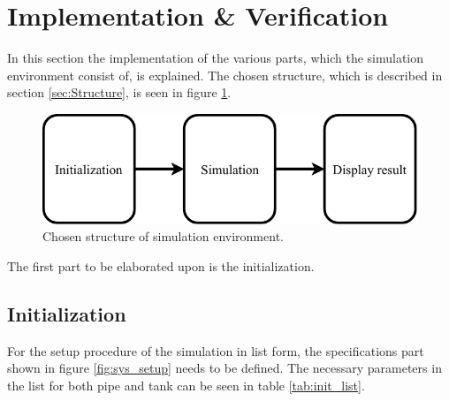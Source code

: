 \section{Implementation \& Verification}\label{sec:implementation_and_verfication}

In this section the implementation of the various parts, which the simulation environment consist of, is explained. The chosen structure, which is described in section \ref{sec:Structure}, is seen in figure \ref{fig:Basic_implementation}. 

\begin{figure}[H]
\centering
\includegraphics[width=0.75 \textwidth]{report/simulation/pictures/Basic_implementation.pdf}
\caption{Chosen structure of simulation environment.}
\label{fig:Basic_implementation}
\end{figure}

The first part to be elaborated upon is the initialization.

 \subsection*{Initialization}

For the setup procedure of the simulation in list form, the specifications part shown in figure \ref{fig:sys_setup} needs to be defined. The necessary parameters in the list for both pipe and tank can be seen in table \ref {tab:init_list}. 

